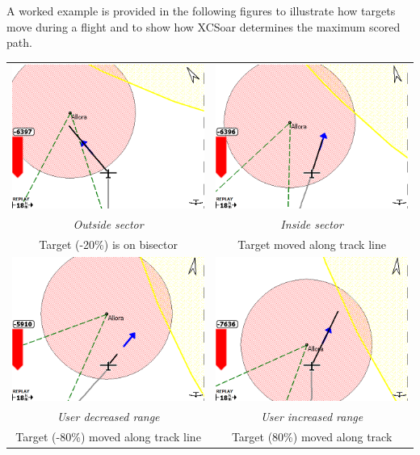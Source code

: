 \documentclass[a4paper,12pt]{refrep}
\begin{document}
A worked example is provided in the following figures to illustrate
how targets move during a flight and to show how XCSoar determines the
maximum scored path.

\begin{maxipage}
\begin{center}
\begin{longtable}{|c|c|}
\toprule
\includegraphics[angle=0,width=0.45\linewidth,keepaspectratio='true']{figures/faat01.png} & 
\includegraphics[angle=0,width=0.45\linewidth,keepaspectratio='true']{figures/faat02.png} \\
{\em Outside sector} & {\em Inside sector} \\
Target (-20\%) is on bisector & Target moved along track line \\

\midrule
\includegraphics[angle=0,width=0.45\linewidth,keepaspectratio='true']{figures/faat03.png} & 
\includegraphics[angle=0,width=0.45\linewidth,keepaspectratio='true']{figures/faat04.png} \\
{\em User decreased range} & {\em User increased range} \\
Target (-80\%) moved along track line & Target (80\%) moved along track \\


\end{longtable}
\end{center}
\end{maxipage}
\end{document}
